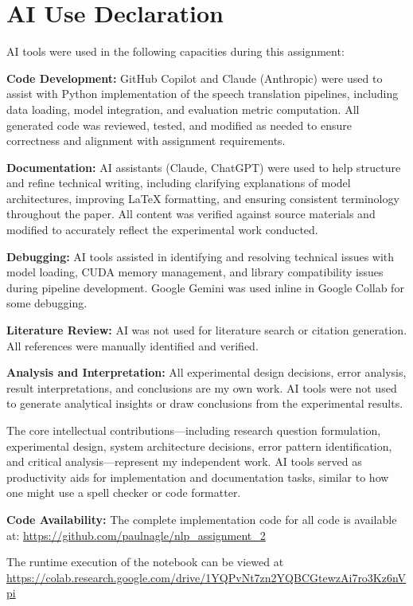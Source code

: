 \documentclass[11pt]{article}
\begin{document}
%


\appendix

\section{AI Use Declaration}
\label{sec:appendix}

AI tools were used in the following capacities during this assignment:

\textbf{Code Development:} GitHub Copilot and Claude (Anthropic) were used to assist with Python implementation of the speech translation pipelines, including data loading, model integration, and evaluation metric computation. All generated code was reviewed, tested, and modified as needed to ensure correctness and alignment with assignment requirements.

\textbf{Documentation:} AI assistants (Claude, ChatGPT) were used to help structure and refine technical writing, including clarifying explanations of model architectures, improving LaTeX formatting, and ensuring consistent terminology throughout the paper. All content was verified against source materials and modified to accurately reflect the experimental work conducted.

\textbf{Debugging:} AI tools assisted in identifying and resolving technical issues with model loading, CUDA memory management, and library compatibility issues during pipeline development. Google Gemini was used inline in Google Collab for some debugging.

\textbf{Literature Review:} AI was not used for literature search or citation generation. All references were manually identified and verified.

\textbf{Analysis and Interpretation:} All experimental design decisions, error analysis, result interpretations, and conclusions are my own work. AI tools were not used to generate analytical insights or draw conclusions from the experimental results.

The core intellectual contributions—including research question formulation, experimental design, system architecture decisions, error pattern identification, and critical analysis—represent my independent work. AI tools served as productivity aids for implementation and documentation tasks, similar to how one might use a spell checker or code formatter.

\textbf{Code Availability:} The complete implementation code for all code is available at: \url{https://github.com/paulnagle/nlp_assignment_2}

The runtime execution of the notebook can be viewed at \url{https://colab.research.google.com/drive/1YQPvNt7zn2YQBCGtewzAi7ro3Kz6nVpi}
\end{document}
